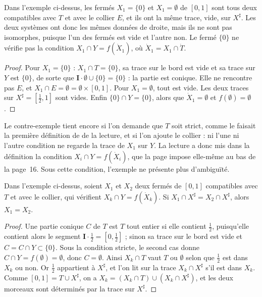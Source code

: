 \begin{encadre}
\begin{contrexemple}
Dans l'exemple ci-dessus, les fermés $X_1 = \{0\}$ et $X_1 = \emptyset$ de $[0, 1]$ sont tous deux compatibles avec $T$ et avec le collier $E$, et ils ont la même trace, vide, sur $X^\sharp$. Les deux systèmes ont donc les mêmes données de droite, mais ils ne sont pas isomorphes, puisque l'un des fermés est vide et l'autre non. Le fermé $\{0\}$ ne vérifie pas la condition $X_1 \cap Y = f(\dot X_1)$, où $\dot X_1 = X_1 \cap \dot T$.
\end{contrexemple}
\end{encadre}

\begin{proof}
Pour $X_1 = \{0\}$ : $X_1 \cap T = \{0\}$, sa trace sur le bord est vide et sa trace sur $Y$ est $\{0\}$, de sorte que $\mathbf I \cdot \emptyset \cup \{0\} = \{0\}$ : la partie est conique. Elle ne rencontre pas $E$, et $X_1 \cap E = \emptyset = \emptyset \times [0, 1]$. Pour $X_1 = \emptyset$, tout est vide. Les deux traces sur $X^\sharp = [\frac12, 1]$ sont vides. Enfin $\{0\} \cap Y = \{0\}$, alors que $\dot X_1 = \emptyset$ et $f(\emptyset) = \emptyset$.
\end{proof}

Le contre-exemple tient encore si l'on demande que $T$ soit strict, comme le faisait la première définition de  de la lecture, et si l'on ajoute le collier : ni l'une ni l'autre condition ne regarde la trace de $X_1$ sur $Y$. La lecture a donc mis dans la définition la condition $X_i \cap Y = f(\dot X_i)$, que la page impose elle-même au bas de la page~16. Sous cette condition, l'exemple ne présente plus d'ambiguïté.

\begin{encadre}
\begin{enonce}
Dans l'exemple ci-dessus, soient $X_1$ et $X_2$ deux fermés de $[0, 1]$ compatibles avec $T$ et avec le collier, qui vérifient $X_k \cap Y = f(\dot X_k)$. Si $X_1 \cap X^\sharp = X_2 \cap X^\sharp$, alors $X_1 = X_2$.
\end{enonce}
\end{encadre}

\begin{proof}
Une partie conique $C$ de $T$ est $T$ tout entier si elle contient $\frac12$, puisqu'elle contient alors le segment $\mathbf I \cdot \frac12 = [0, \frac12]$ ; sinon sa trace sur le bord est vide et $C = C \cap Y \subset \{0\}$. Sous la condition stricte, le second cas donne $C \cap Y = f(\emptyset) = \emptyset$, donc $C = \emptyset$. Ainsi $X_k \cap T$ vaut $T$ ou $\emptyset$ selon que $\frac12$ est dans $X_k$ ou non. Or $\frac12$ appartient à $X^\sharp$, et l'on lit sur la trace $X_k \cap X^\sharp$ s'il est dans $X_k$. Comme $[0, 1] = T \cup X^\sharp$, on a $X_k = (X_k \cap T) \cup (X_k \cap X^\sharp)$, et les deux morceaux sont déterminés par la trace sur $X^\sharp$.
\end{proof}

